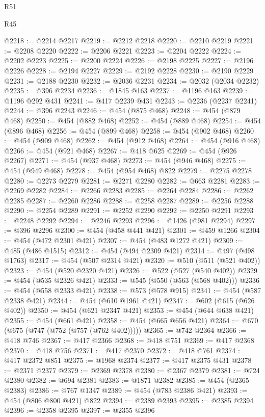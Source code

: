 \begin{lexlean}{R51}
\begin{lexlean}{R45}
\begin{coremodule}
{{{{{{{{{{{{{{{{{{{{{{{{{{{{{{{{{{{{{{{{{{{{{{{{{{{{{{{{{{{{{{{{{{{{{{{{{{{{{{{{{{{{{{{{{{{@2218 := @2214 @2217
@2219 := @2212 @2218
@2220 := @2210 @2219
@2221 := @2208 @2220
@2222 := @2206 @2221
@2223 := @2204 @2222
@2224 := @2202 @2223
@2225 := @2200 @2224
@2226 := @2198 @2225
@2227 := @2196 @2226
@2228 := @2194 @2227
@2229 := @2192 @2228
@2230 := @2190 @2229
@2231 := @2188 @2230
@2232 := @2036 @2231
@2234 := @2032 (@2034 @2232)
@2235 := @396 @2234
@2236 := @1845 @163
@2237 := @1196 @163
@2239 := @1196 @292 @431
@2241 := @417 @2239 @431
@2243 := @2236 (@2237 @2241)
@2244 := @396 @2243
@2246 := @454 (@875 @468)
@2248 := @454 (@879 @468)
@2250 := @454 (@882 @468)
@2252 := @454 (@889 @468)
@2254 := @454 (@896 @468)
@2256 := @454 (@899 @468)
@2258 := @454 (@902 @468)
@2260 := @454 (@909 @468)
@2262 := @454 (@912 @468)
@2264 := @454 (@916 @468)
@2266 := @454 (@921 @468)
@2267 := @418 @625
@2269 := @454 (@926 @2267)
@2271 := @454 (@937 @468)
@2273 := @454 (@946 @468)
@2275 := @454 (@949 @468)
@2278 := @454 (@954 @468) @822
@2279 := @2275 @2278
@2280 := @2273 @2279
@2281 := @2271 @2280
@2282 := @663 @2281
@2283 := @2269 @2282
@2284 := @2266 @2283
@2285 := @2264 @2284
@2286 := @2262 @2285
@2287 := @2260 @2286
@2288 := @2258 @2287
@2289 := @2256 @2288
@2290 := @2254 @2289
@2291 := @2252 @2290
@2292 := @2250 @2291
@2293 := @2248 @2292
@2294 := @2246 @2293
@2296 := @1426 (@981 @2294)
@2297 := @396 @2296
@2300 := @454 (@458 @441 @421)
@2301 := @459 @1266
@2304 := @454 (@472 @2301 @421)
@2307 := @454 (@483 @1272 @421)
@2309 := @485 (@486 @1515)
@2312 := @454 (@494 @2309 @421)
@2314 := @497 (@498 @1763)
@2317 := @454 (@507 @2314 @421)
@2320 := @510 (@511 (@521 @402))
@2323 := @454 (@520 @2320 @421)
@2326 := @522 (@527 (@540 @402))
@2329 := @454 (@535 @2326 @421)
@2333 := @545 (@550 (@563 (@568 @402)))
@2336 := @454 (@558 @2333 @421)
@2338 := @573 (@578 @915)
@2341 := @454 (@587 @2338 @421)
@2344 := @454 (@610 @1961 @421)
@2347 := @602 (@615 (@626 @402))
@2350 := @454 (@621 @2347 @421)
@2353 := @454 (@644 @638 @421)
@2355 := @454 (@661 @421)
@2358 := @454 (@665 @656 @421)
@2364 := @670 (@675 (@747 (@752 (@757 (@762 @402)))))
@2365 := @742 @2364
@2366 := @418 @746
@2367 := @417 @2366
@2368 := @418 @751
@2369 := @417 @2368
@2370 := @418 @756
@2371 := @417 @2370
@2372 := @418 @761
@2374 := @417 @2372 @851
@2375 := @1968 @2374
@2377 := @417 @2375 @431
@2378 := @2371 @2377
@2379 := @2369 @2378
@2380 := @2367 @2379
@2381 := @724 @2380
@2382 := @694 @2381
@2383 := @1871 @2382
@2385 := @454 (@2365 @2383)
@2386 := @767 @1347
@2389 := @454 (@783 @2386 @421)
@2393 := @454 (@806 @800 @421) @822
@2394 := @2389 @2393
@2395 := @2385 @2394
@2396 := @2358 @2395
@2397 := @2355 @2396
}}}}}}}}}}}}}}}}}}}}}}}}}}}}}}}}}}}}}}}}}}}}}}}}}}}}}}}}}}}}}}}}}}}}}}}}}}}}}}}}}}}}}}}}}}}
\end{coremodule}
\end{lexlean}
\end{lexlean}
